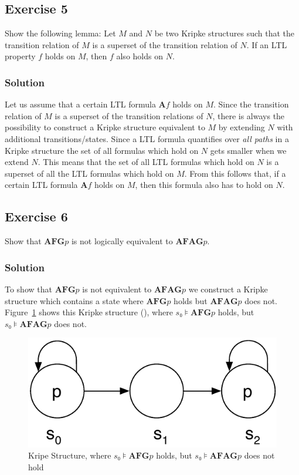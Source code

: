 \documentclass[a4paper, 12pt]{article}
\begin{document}
\subsection{Exercise 5}

Show the following lemma: Let $M$ and $N$ be two Kripke structures such that
the transition relation of $M$ is a superset of the transition relation of
$N$. If an LTL property $f$ holds on $M$, then $f$ also holds on $N$.

\subsubsection{Solution}

Let us assume that a certain LTL formula $\mathbf{A}f$ holds on $M$. Since the
transition relation of $M$ is a superset of the transition relations of $N$,
there is always the possibility to construct a Kripke structure equivalent to
$M$ by extending $N$ with additional transitions/states. Since a LTL formula
quantifies over \emph{all paths} in a Kripke structure the set of all formulas
which hold on $N$ gets smaller when we extend $N$. This means that the set of
all LTL formulas which hold on $N$ is a superset of all the LTL formulas which
hold on $M$. From this follows that, if a certain LTL formula $\mathbf{A}f$
holds on $M$, then this formula also has to hold on $N$.

\subsection{Exercise 6}

Show that $\mathbf{AFG} p$ is not logically equivalent to $\mathbf{AFAG} p$.

\subsubsection{Solution}

To show that $\mathbf{AFG} p$ is not equivalent to $\mathbf{AFAG} p$ we
construct a Kripke structure which contains a state where $\mathbf{AFG} p$
holds but $\mathbf{AFAG} p$ does not.
Figure~\ref{figure:Kripke_Structure_Exercise_6} shows this Kripke structure
(\cite{Veith2011ExerciseSolutions}), where $s₀⊧\mathbf{AFG} p$ holds, but
$s₀⊧\mathbf{AFAG} p$ does not.

\begin{figure}[htbp]
    \centering
        \includegraphics[width=.4\textwidth]
            {Figures/Kripke Structure Exercise 6.pdf}
    \caption{Kripe Structure, where $s₀⊧\mathbf{AFG} p$ holds, but
             $s₀⊧\mathbf{AFAG} p$ does not hold}
    \label{figure:Kripke_Structure_Exercise_6}
\end{figure}
\end{document}
